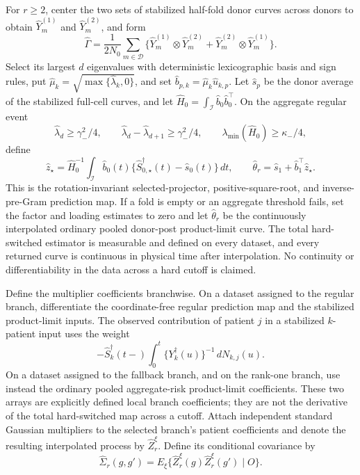 For \(r\ge2\), center the two sets of stabilized half-fold donor curves across donors to obtain \(\widehat Y_m^{(1)}\) and \(\widehat Y_m^{(2)}\), and form
\[
 \widehat\Gamma=\frac{1}{2N_0}\sum_{m\in\mathcal D}
 \{\widehat Y_m^{(1)}\otimes\widehat Y_m^{(2)}+
   \widehat Y_m^{(2)}\otimes\widehat Y_m^{(1)}\}.
\]
Select its largest \(d\) eigenvalues with deterministic lexicographic basis and sign rules, put \(\widehat\mu_k=\sqrt{\max\{\widehat\lambda_k,0\}}\), and set \(\widehat b_{p,k}=\widehat\mu_k\widehat u_{k,p}\). Let \(\widehat s_p\) be the donor average of the stabilized full-cell curves, and let \(\widehat H_0=\int_{\mathcal I}\widehat b_0\widehat b_0^\top\). On the aggregate regular event
\[
 \widehat\lambda_d\ge\gamma_-^2/4,\qquad
 \widehat\lambda_d-\widehat\lambda_{d+1}\ge\gamma_-^2/4,
 \qquad \lambda_{\min}(\widehat H_0)\ge\kappa_-/4,
\]
define
\[
 \widehat z_\star=\widehat H_0^{-1}\int_{\mathcal I}\widehat b_0(t)
 \{\widehat S_{0,\star}^\dagger(t)-\widehat s_0(t)\}\,dt,
 \qquad
 \widehat\theta_r=\widehat s_1+\widehat b_1^\top\widehat z_\star.
\]
This is the rotation-invariant selected-projector, positive-square-root, and inverse-pre-Gram prediction map. If a fold is empty or an aggregate threshold fails, set the factor and loading estimates to zero and let \(\widehat\theta_r\) be the continuously interpolated ordinary pooled donor-post product-limit curve. The total hard-switched estimator is measurable and defined on every dataset, and every returned curve is continuous in physical time after interpolation. No continuity or differentiability in the data across a hard cutoff is claimed.

Define the multiplier coefficients branchwise. On a dataset assigned to the regular branch, differentiate the coordinate-free regular prediction map and the stabilized product-limit inputs. The observed contribution of patient \(j\) in a stabilized \(k\)-patient input uses the weight
\[
 -\widehat S_k^\dagger(t-)
 \int_0^t\{Y_k^\dagger(u)\}^{-1}\,dN_{k,j}(u).
\]
On a dataset assigned to the fallback branch, and on the rank-one branch, use instead the ordinary pooled aggregate-risk product-limit coefficients. These two arrays are explicitly defined local branch coefficients; they are not the derivative of the total hard-switched map across a cutoff. Attach independent standard Gaussian multipliers to the selected branch's patient coefficients and denote the resulting interpolated process by \(\widehat Z_r^\xi\). Define its conditional covariance by
\[
 \widehat\Sigma_r(g,g')
 =E_\xi\{\widehat Z_r^\xi(g)\widehat Z_r^\xi(g')\mid O\}.
\]

